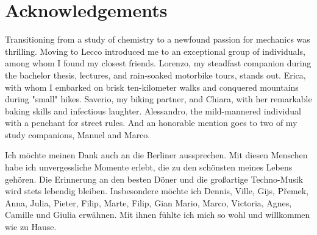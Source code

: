 \documentclass{Configuration_Files/PoliMi3i_thesis}
\begin{document}
\listoffigures

\listoftables


\chapter*{Acknowledgements}

Transitioning from a study of chemistry to a newfound passion for mechanics was thrilling. Moving to Lecco introduced me to an exceptional group of individuals, among whom I found my closest friends. Lorenzo, my steadfast companion during the bachelor thesis, lectures, and rain-soaked motorbike tours, stands out. Erica, with whom I embarked on brisk ten-kilometer walks and conquered mountains during "small" hikes. Saverio, my biking partner, and Chiara, with her remarkable baking skills and infectious laughter. Alessandro, the mild-mannered individual with a penchant for street rules. And an honorable mention goes to two of my study companions, Manuel and Marco.

Ich möchte meinen Dank auch an die Berliner aussprechen. Mit diesen Menschen habe ich unvergessliche Momente erlebt, die zu den schönsten meines Lebens gehören. Die Erinnerung an den besten Döner und die großartige Techno-Musik wird stets lebendig bleiben. Insbesondere möchte ich Dennis, Ville, Gijs, P\v{r}emek, Anna, Julia, Pieter, Filip, Marte, Filip, Gian Mario, Marco, Victoria, Agnes, Camille und Giulia erwähnen. Mit ihnen fühlte ich mich so wohl und willkommen wie zu Hause.
\end{document}
